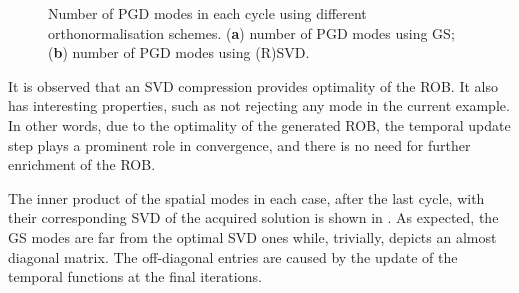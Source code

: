 \begin{figure}[hbt!]
	\centering
	\begin{subfigure}[]{0.49\linewidth}
		
		\caption{}
		\label{fig_number_pgd_modes_12cycles_mgs}
	\end{subfigure}
	\hfil
	\begin{subfigure}[]{0.49\linewidth}
		
		\caption{}
	\end{subfigure}
	\caption{Number of PGD modes in each cycle using different orthonormalisation schemes. (\textbf{a}) number of PGD modes using {GS}; (\textbf{b}) number of PGD modes using {(R)SVD}.}
	\label{fig_number_pgd_modes_12cycles}
\end{figure}

It is observed that an SVD compression provides optimality of the ROB. It also has interesting properties, such as not rejecting any mode in the current example. In other words, due to the optimality of the generated ROB, the temporal update step plays a prominent role in convergence, and there is no need for further enrichment of the ROB.

The inner product of the spatial modes in each case, after the last cycle, with their corresponding SVD of the acquired solution is shown in . As expected, the GS modes are far from the optimal SVD ones while, trivially,  depicts an almost diagonal matrix. The off-diagonal entries are caused by the update of the temporal functions at the final iterations.

